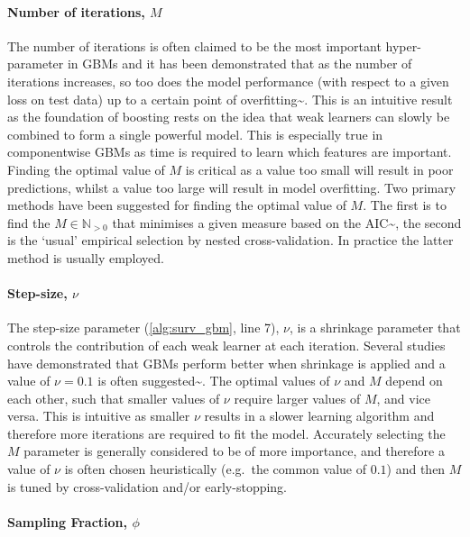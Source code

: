\documentclass[
  letterpaper,
]{scrbook}
\let\oldparagraph\paragraph
\renewcommand{\paragraph}[1]{\oldparagraph{#1}\mbox{}}
\theoremstyle{plain}
\theoremstyle{definition}
\theoremstyle{remark}
\begin{document}
\paragraph{Number of iterations, $M$}

The number of iterations is often claimed to be the most important
hyper-parameter in GBMs and it has been demonstrated that as the number
of iterations increases, so too does the model performance (with respect
to a given loss on test data) up to a certain point of
overfitting\textasciitilde{}\cite{Buhlmann2006, Hastie2001, Schmid2008a}.
This is an intuitive result as the foundation of boosting rests on the
idea that weak learners can slowly be combined to form a single powerful
model. This is especially true in componentwise GBMs as time is required
to learn which features are important. Finding the optimal value of
\(M\) is critical as a value too small will result in poor predictions,
whilst a value too large will result in model overfitting. Two primary
methods have been suggested for finding the optimal value of \(M\). The
first is to find the \(M \in \mathbb{N}_{> 0}\) that minimises a given
measure based on the AIC\textasciitilde{}\cite{Akaike1974}, the second
is the `usual' empirical selection by nested cross-validation. In
practice the latter method is usually employed.

\paragraph{Step-size, $\nu$}

The step-size parameter (\ref{alg:surv_gbm}, line 7), \(\nu\), is a
shrinkage parameter that controls the contribution of each weak learner
at each iteration. Several studies have demonstrated that GBMs perform
better when shrinkage is applied and a value of \(\nu = 0.1\) is often
suggested\textasciitilde{}\cite{Buhlmann2007, Hastie2001, Friedman2001, Lee2018, Schmid2008a}.
The optimal values of \(\nu\) and \(M\) depend on each other, such that
smaller values of \(\nu\) require larger values of \(M\), and vice
versa. This is intuitive as smaller \(\nu\) results in a slower learning
algorithm and therefore more iterations are required to fit the model.
Accurately selecting the \(M\) parameter is generally considered to be
of more importance, and therefore a value of \(\nu\) is often chosen
heuristically (e.g.~the common value of \(0.1\)) and then \(M\) is tuned
by cross-validation and/or early-stopping.

\paragraph{Sampling Fraction, $\phi$}
\end{document}
